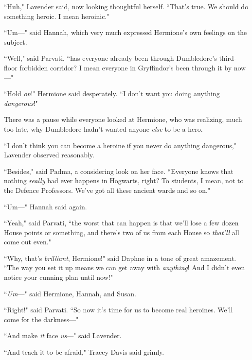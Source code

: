 ``Huh," Lavender said, now looking thoughtful herself. ``That's true. We should do something heroic. I mean heroinic."

``Um—" said Hannah, which very much expressed Hermione's own feelings on the subject.

``Well," said Parvati, ``has everyone already been through Dumbledore's third-floor forbidden corridor? I mean everyone in Gryffindor's been through it by now—"

``Hold \emph{on}!" Hermione said desperately. ``I don't want you doing anything \emph{dangerous}!"

There was a pause while everyone looked at Hermione, who was realizing, much too late, why Dumbledore hadn't wanted anyone \emph{else} to be a hero.

``I don't think you can become a heroine if you never do anything dangerous," Lavender observed reasonably.

``Besides," said Padma, a considering look on her face. ``Everyone knows that nothing \emph{really} bad ever happens in Hogwarts, right? To students, I mean, not to the Defence Professors. We've got all these ancient wards and so on."

``Um—" Hannah said again.

``Yeah," said Parvati, ``the worst that can happen is that we'll lose a few dozen House points or something, and there's two of us from each House so \emph{that'll} all come out even."

``Why, that's \emph{brilliant}, Hermione!" said Daphne in a tone of great amazement. ``The way you set it up means we can get away with \emph{anything}! And I didn't even notice your cunning plan until now!"

``\emph{Um}—" said Hermione, Hannah, and Susan.

``Right!" said Parvati. ``So now it's time for us to become real heroines. We'll come for the darkness—"

``And make \emph{it} face \emph{us}—" said Lavender.

``And teach it to be afraid," Tracey Davis said grimly.

